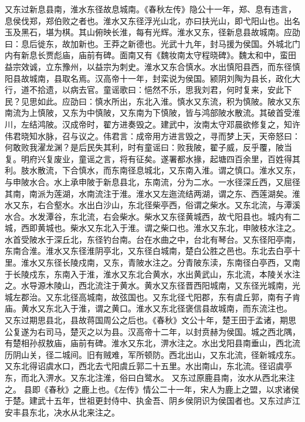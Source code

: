 \documentclass[12pt,UTF8]{ctexbook}
\begin{document}
又东过新息县南，淮水东径故息城南。《春秋左传》隐公十一年，郑、息有违言，息侯伐郑，郑伯败之者也。淮水又东径浮光山北，亦曰扶光山，即弋阳山也。出名玉及黑石，堪为棋。其山俯映长淮，每有光辉。淮水又东，径新息县故城南。应劭曰：息后徙东，故加新也。王莽之新德也。光武十九年，封马援为侯国。外城北门内有新息长贾彪庙，庙前有碑。面南又有《魏妆南太守程晓碑》。魏太和中，蛮田益宗效诚，立东豫州，以益宗为刺史。淮水又东合慎水。水出慎阳县西，而东径慎阳县故城南，县取名焉。汉高帝十一年，封栾说为侯国。颍阴刘陶为县长，政化大行，道不拾遗，以病去官。童谣歌曰：悒然不乐，思我刘君，何时复来，安此下民？见思如此。应劭曰：慎水所出，东北入淮。慎水又东流，积为慎陂。陂水又东南流为上慎陂，又东为中慎陂，又东南为下慎陂，皆与鸿部陂水散流。其破首受淮川，左结鸿陂。汉成帝时，翟方进奏毁之。建武中，汝南太守邓晨欲修复之，知许伟君晓知水脉，召与议之。伟君言：成帝用方进言毁之，寻而梦上天，天帝怒曰：何敢败我濯龙渊？是后民失其利，时有童谣曰：败我陂，翟子威，反乎覆，陂当复。明府兴复废业，童谣之言，将有征矣。遂署都水掾，起塘四百余里，百姓得其利。肢水散流，下合慎水，而东南径息城北，又东南入淮。谓之慎口。淮水又东，与申陂水合。水上承申陂于新息县北，东南流，分为二水。一水径深丘西，又屈径其南，南派为莲湖，水南流注于淮。淮水又左迤流结两湖，谓之东、西莲湖矣。淮水又东，右合壑水。水出白沙山，东北径柴亭西，俗谓之柴水。又东北流，与潭溪水合。水发潭谷，东北流，右会柴水。柴水又东径黄城西，故弋阳县也。城内有二城，西即黄城也。柴水又东北入于淮。谓之柴口也。淮水又东北，申陂枝水注之。水首受陂水于深丘北，东径钓台南。台在水曲之中，台北有琴台。又东径阳亭南，东南合淮。淮水又东径淮阴亭北，又东径白城南，楚白公胜之邑也。东北去白亭十里。淮水又东径长陵戍南，又东，青陂水注之。分青陂东渎，东南径白亭西，又南于长陵戍东，东南入于淮，淮水又东北合黄水，水出黄武山，东北流，本陵关水注之。水导源木陵山，西北流注于黄水。黄水又东径晋西阳城南，又东径光城南，光城左郡治。又东北径高城南，故弦国也。又东北径弋阳郡，东有虞丘郭，南有子肯庙。黄水又东北入于淮，谓之黄口。淮水又东北径褒信县故城南，而东流注也。
又东过期思县北，县故蒋国周公之后也。《春秋》文公十年，楚王田于孟诸，期思公复遂为右司马，楚灭之以为县。汉高帝十二年，以封贲赫为侯国。城之西北隅，有楚相孙叔敖庙，庙前有碑。淮水又东北，淠水注之。水出戈阳县南垂山，西北流历阴山关，径二城间。旧有贼难，军所顿防。西北出山，又东北流，径新城戍东。又东北得诏虞水口，西北去弋阳虞丘郭二十五里。水出南山，东北流。径诏虞亭东，而北入淠水。又东北注淮，俗曰白鹭水。
又东过原鹿县南，汝水从西北来注之。
县即《春秋》之鹿上也。《左传》情公二十一年，宋人为鹿上之盟，以求诸侯于楚。建武十五年，世祖更封侍中、执金吾、阴乡侯阴识为侯国者也。又东过庐江安丰县东北，决水从北来注之。
\end{document}
